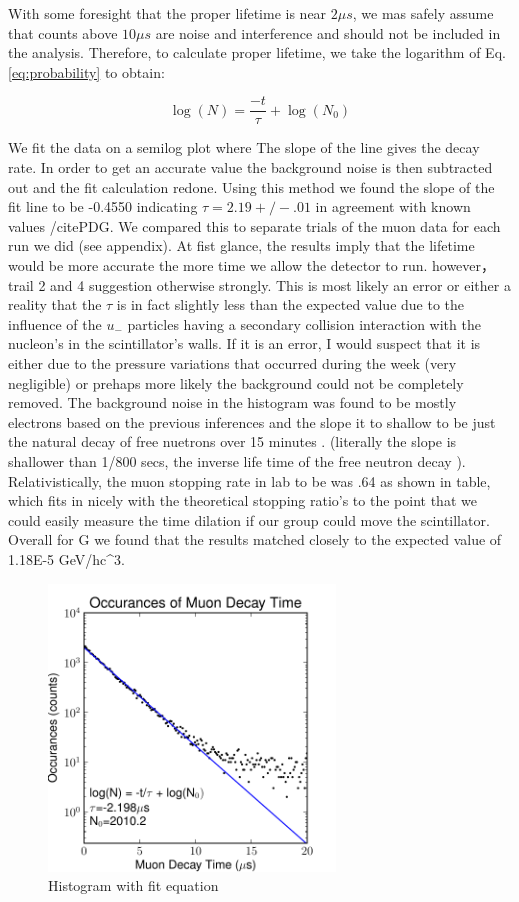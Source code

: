 \documentclass[12pt,twocolumn]{article}
\begin{document}
With some foresight that the proper lifetime is near $2\mu s$, we mas safely assume that counts above $10\mu s$ are
noise and interference and should not be included in the analysis. Therefore, to calculate proper lifetime, we take
the logarithm of Eq. \ref{eq:probability} to obtain:

 \begin{equation}
	 \label{eq:probability}
	 \log(N)=\frac{-t}{\tau} + \log(N_{0})
 \end{equation}

 We fit the data on a semilog plot where The slope of the line gives the decay rate.  In order to get an accurate value the background noise is then subtracted out and the fit calculation redone. Using this method we found the slope of the fit line to be -0.4550 indicating $\tau=2.19 +/- .01$ in agreement with known values /cite{PDG}.  We compared this to separate trials of the muon data for each run we did (see appendix). At fist glance, the results imply that the lifetime would be more accurate the more time we allow the detector to run. however， trail 2 and 4 suggestion otherwise strongly.  This is most likely an error or either a reality that the $\tau$ is in fact slightly less than the expected value due to the influence of the $u_{-}$ particles having a secondary collision interaction with the nucleon's in the scintillator's walls.  If it is an error, I would suspect that it is either due to the pressure variations that occurred during the week (very negligible) or prehaps more likely the background could not be completely removed.    The background noise in the histogram was found to be mostly electrons based on the previous inferences and the slope it to shallow to be just the natural decay of free nuetrons over 15 minutes .  (literally the slope is shallower than 1/800 secs, the inverse life time of the free neutron decay \cite{PDG}).  Relativistically, the muon stopping rate in lab to be was .64 as shown in table, which fits in nicely with the theoretical stopping ratio's to the point that we could easily measure the time dilation if our group could move the scintillator. Overall for G we found that the results matched closely to the expected value of 1.18E-5 GeV/hc^3.

\begin{figure}[h!]
	\centering
	\label{fig:fit1}
	\includegraphics[width=3in]{images/fit1-eps-converted-to}
	\caption{Histogram with fit equation}
\end{figure}
\end{document}
